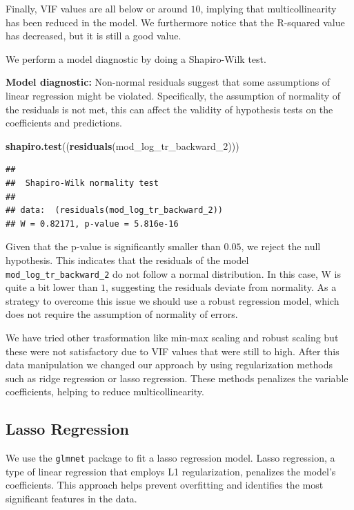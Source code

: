 \documentclass[
]{article}
\newenvironment{Shaded}{\begin{snugshade}}{\end{snugshade}}
\newcommand{\FunctionTok}[1]{\textcolor[rgb]{0.13,0.29,0.53}{\textbf{#1}}}
\newcommand{\NormalTok}[1]{#1}
\begin{document}
Finally, VIF values are all below or around \(10\), implying that
multicollinearity has been reduced in the model. We furthermore notice
that the R-squared value has decreased, but it is still a good value.

We perform a model diagnostic by doing a Shapiro-Wilk test.

\textbf{Model diagnostic:} Non-normal residuals suggest that some
assumptions of linear regression might be violated. Specifically, the
assumption of normality of the residuals is not met, this can affect the
validity of hypothesis tests on the coefficients and predictions.

\begin{Shaded}
\begin{Highlighting}[]
\FunctionTok{shapiro.test}\NormalTok{((}\FunctionTok{residuals}\NormalTok{(mod\_log\_tr\_backward\_2)))}
\end{Highlighting}
\end{Shaded}

\begin{verbatim}
## 
##  Shapiro-Wilk normality test
## 
## data:  (residuals(mod_log_tr_backward_2))
## W = 0.82171, p-value = 5.816e-16
\end{verbatim}

Given that the p-value is significantly smaller than \(0.05\), we reject
the null hypothesis. This indicates that the residuals of the model
\texttt{mod\_log\_tr\_backward\_2} do not follow a normal distribution.
In this case, W is quite a bit lower than \(1\), suggesting the
residuals deviate from normality. As a strategy to overcome this issue
we should use a robust regression model, which does not require the
assumption of normality of errors.

We have tried other trasformation like min-max scaling and robust
scaling but these were not satisfactory due to VIF values that were
still to high. After this data manipulation we changed our approach by
using regularization methods such as ridge regression or lasso
regression. These methods penalizes the variable coefficients, helping
to reduce multicollinearity.

\subsection{Lasso Regression}\label{lasso-regression}

We use the \texttt{glmnet} package to fit a lasso regression model.
Lasso regression, a type of linear regression that employs L1
regularization, penalizes the model's coefficients. This approach helps
prevent overfitting and identifies the most significant features in the
data.
\end{document}
